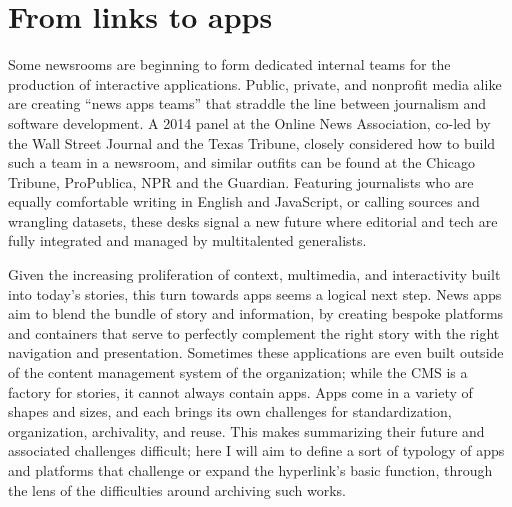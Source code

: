 
\section{From links to apps}

Some newsrooms are beginning to form dedicated internal teams for the production of interactive applications. Public, private, and nonprofit media alike are creating ``news apps teams'' that straddle the line between journalism and software development. A 2014 panel at the Online News Association, co-led by the Wall Street Journal and the Texas Tribune, closely considered how to build such a team in a newsroom, and similar outfits can be found at the Chicago Tribune, ProPublica, NPR and the Guardian.\autocite{mcbride_how_2014} Featuring journalists who are equally comfortable writing in English and JavaScript, or calling sources and wrangling datasets, these desks signal a new future where editorial and tech are fully integrated and managed by multitalented generalists.

Given the increasing proliferation of context, multimedia, and interactivity built into today's stories, this turn towards apps seems a logical next step. News apps aim to blend the bundle of story and information, by creating bespoke platforms and containers that serve to perfectly complement the right story with the right navigation and presentation. Sometimes these applications are even built outside of the content management system of the organization; while the CMS is a factory for stories, it cannot always contain apps. Apps come in a variety of shapes and sizes, and each brings its own challenges for standardization, organization, archivality, and reuse. This makes summarizing their future and associated challenges difficult; here I will aim to define a sort of typology of apps and platforms that challenge or expand the hyperlink's basic function, through the lens of the difficulties around archiving such works.

